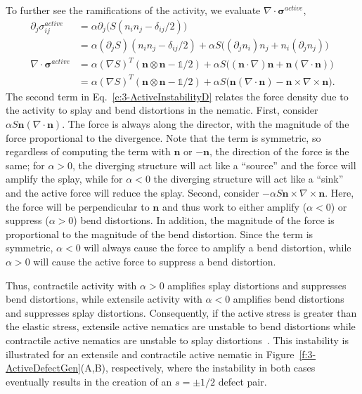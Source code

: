 To further see the ramifications of the activity, we evaluate $\nabla \cdot \bm{\sigma}^{active}$,
\begin{align}
  \partial_j \sigma^{active}_{ij} &= \alpha \partial_j \big(S(n_in_j - \delta_{ij}/2)\big)\label{e:3-ActiveInstabilityA} \\
  &= \alpha(\partial_j S)(n_in_j - \delta_{ij}/2) + \alpha S \big((\partial_j n_i)n_j + n_i(\partial_j n_j) \big) \\
  \nabla \cdot \bm{\sigma}^{active} &= \alpha (\nabla S)^T(\mathbf{n} \otimes \mathbf{n}-\mathbb{1}/2) + \alpha S \big((\mathbf{n} \cdot \nabla)\mathbf{n} + \mathbf{n}(\nabla \cdot \mathbf{n}) \big) \\
  &=  \alpha (\nabla S)^T(\mathbf{n} \otimes \mathbf{n}-\mathbb{1}/2) + \alpha S \big(\mathbf{n}(\nabla \cdot \mathbf{n}) - \mathbf{n} \times \nabla \times \mathbf{n}  \big).\label{e:3-ActiveInstabilityD}
\end{align}
The second term in Eq.~\ref{e:3-ActiveInstabilityD} relates the force density due to the activity to splay and bend distortions in the nematic.
First, consider $\alpha S \mathbf{n}(\nabla \cdot \mathbf{n})$.
The force is always along the director, with the magnitude of the force proportional to the divergence.
Note that the term is symmetric, so regardless of computing the term with $\mathbf{n}$ or $-\mathbf{n}$, the direction of the force is the same; for $\alpha > 0$, the diverging structure will act like a ``source'' and the force will amplify the splay, while for $\alpha < 0$ the diverging structure will act like a ``sink'' and the active force will reduce the splay.
Second, consider $- \alpha S \mathbf{n} \times \nabla \times \mathbf{n}$. Here, the force will be perpendicular to $\mathbf{n}$ and thus work to either amplify ($\alpha < 0$) or suppress ($\alpha > 0$) bend distortions.
In addition, the magnitude of the force is proportional to the magnitude of the bend distortion.
Since the term is symmetric, $\alpha < 0$ will always cause the force to amplify a bend distortion, while $\alpha > 0$ will cause the active force to suppress a bend distortion.

Thus, contractile activity with $\alpha > 0$ amplifies splay distortions and suppresses bend distortions, while extensile activity with $\alpha < 0$ amplifies bend distortions and suppresses splay distortions.
Consequently, if the active stress is greater than the elastic stress,  extensile active nematics are unstable to bend distortions while contractile active nematics are unstable to splay distortions~\cite{RN171,RN170,RN11}.
This instability is illustrated for an extensile and contractile active nematic in Figure~\ref{f:3-ActiveDefectGen}(A,B), respectively, where the instability in both cases eventually results in the creation of an $s=\pm 1/2$ defect pair.

